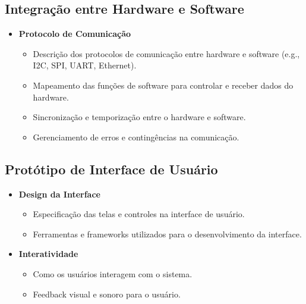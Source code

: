     \subsection{Integração entre Hardware e Software}
    
    \begin{itemize}
        \item \textbf{Protocolo de Comunicação}
        \begin{itemize}
            \item Descrição dos protocolos de comunicação entre hardware e software (e.g., I2C, SPI, UART, Ethernet).
            \item Mapeamento das funções de software para controlar e receber dados do hardware.
            \item Sincronização e temporização entre o hardware e software.
            \item Gerenciamento de erros e contingências na comunicação.
        \end{itemize}
    \end{itemize}
    
    \subsection{Protótipo de Interface de Usuário}
    
    \begin{itemize}
        \item \textbf{Design da Interface}
        \begin{itemize}
            \item Especificação das telas e controles na interface de usuário.
            \item Ferramentas e frameworks utilizados para o desenvolvimento da interface.
        \end{itemize}
        
        \item \textbf{Interatividade}
        \begin{itemize}
            \item Como os usuários interagem com o sistema.
            \item Feedback visual e sonoro para o usuário.
        \end{itemize}
    \end{itemize}